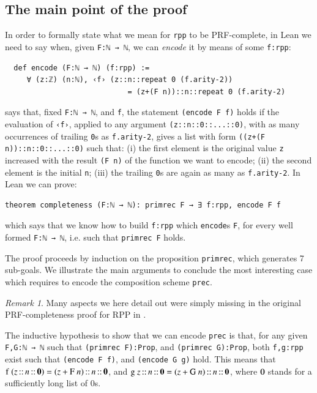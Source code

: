 \documentclass[preprint]{elsarticle}
\theoremstyle{remark}
\newtheorem{remark}{Remark}
\newcommand{\RPP}{\textsf{RPP}\xspace}
\newcommand{\PRF}{\textsf{PRF}\xspace}
\newcommand{\LEAN}{\textsf{Lean}\xspace}
\begin{document}
\subsection{The main point of the proof}
In order to formally state what we mean for \lstinline|rpp| to be \PRF-complete, in \LEAN we need to say when, given \lstinline|F:ℕ → ℕ|, we can \emph{encode} it by means of some \lstinline|f:rpp|:
\begin{lstlisting}
  def encode (F:ℕ → ℕ) (f:rpp) :=
     ∀ (z:ℤ) (n:ℕ), ‹f› (z::n::repeat 0 (f.arity-2))
                            = (z+(F n))::n::repeat 0 (f.arity-2)
\end{lstlisting}
says that, fixed \lstinline|F:ℕ → ℕ|, and \lstinline|f|, the statement \lstinline|(encode F f)| holds if the evaluation of \lstinline|‹f›|, applied to any argument \lstinline|(z::n::0::...::0)|, with as many occurrences of trailing \lstinline|0|s as \lstinline|f.arity-2|, gives a list with form \lstinline|((z+(F n))::n::0::...::0)| such that: (i) the first element is the original value \lstinline|z| increased with the result \lstinline|(F n)| of the function we want to encode; (ii) the second element is the initial \lstinline|n|; (iii) the trailing \lstinline|0|s are again as many as \lstinline|f.arity-2|. In \LEAN we can prove:
\begin{lstlisting}
theorem completeness (F:ℕ → ℕ): primrec F → ∃ f:rpp, encode F f
\end{lstlisting}
which says that we know how to build \lstinline|f:rpp| which \lstinline|encode|s \lstinline|F|, for every well formed \lstinline|F:ℕ → ℕ|, i.e. such that \lstinline|primrec F| holds.

The proof proceeds by induction on the proposition \lstinline|primrec|, which generates 7 sub-goals. We illustrate the main arguments to conclude the most interesting case which requires to encode the composition scheme \lstinline|prec|.

\begin{remark}
Many aspects we here detail out were simply missing in the original \PRF-completeness proof for \RPP in \cite{DBLP:journals/tcs/PaoliniPR20}.
\end{remark}

The inductive hypothesis to show that we can encode \lstinline|prec| is that, for any given \lstinline|F,G:ℕ → ℕ| such that \lstinline|(primrec F):Prop|, and \lstinline|(primrec G):Prop|, both \lstinline|f,g:rpp| exist such that \lstinline|(encode F f)|, and \lstinline|(encode G g)| hold. This means that
$ \mbox{\lstinline|f|}\ (z\mbox{\lstinline|::|}n\mbox{\lstinline|::|}\boldsymbol{0}) =
(z+\mbox{\lstinline|F|}\ n)\mbox{\lstinline|::|}n\mbox{\lstinline|::|}\boldsymbol{0} $, and
$ \mbox{\lstinline|g|}\ z\mbox{\lstinline|::|}n\mbox{\lstinline|::|}\boldsymbol{0} =
(z+\mbox{\lstinline|G|}\ n)\mbox{\lstinline|::|}n\mbox{\lstinline|::|}\boldsymbol{0} $, where $ \boldsymbol{0} $ stands for a sufficiently long list of $ 0 $s.
\end{document}
